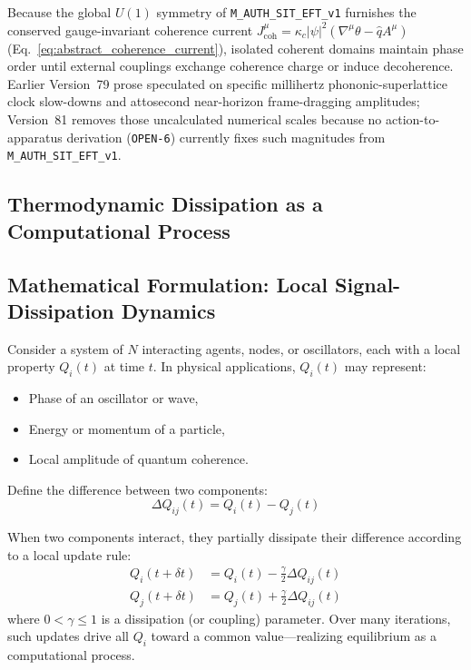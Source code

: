 Because the global $U(1)$ symmetry of \texttt{M\_AUTH\_SIT\_EFT\_v1} furnishes the conserved gauge-invariant coherence current $J^\mu_{\mathrm{coh}} = \kappa_c |\psi|^2 (\nabla^\mu\theta - \hat{q}A^\mu)$ (Eq.~\eqref{eq:abstract_coherence_current}), isolated coherent domains maintain phase order until external couplings exchange coherence charge or induce decoherence. Earlier Version~79 prose speculated on specific millihertz phononic-superlattice clock slow-downs and attosecond near-horizon frame-dragging amplitudes; Version~81 removes those uncalculated numerical scales because no action-to-apparatus derivation (\texttt{OPEN-6}) currently fixes such magnitudes from \texttt{M\_AUTH\_SIT\_EFT\_v1}.

\subsection{Thermodynamic Dissipation as a Computational Process}

\subsection{Mathematical Formulation: Local Signal-Dissipation Dynamics}

Consider a system of $N$ interacting agents, nodes, or oscillators, each with a local property $Q_i(t)$ at time $t$.
In physical applications, $Q_i(t)$ may represent:

\begin{itemize}
    \item Phase of an oscillator or wave,
    \item Energy or momentum of a particle,
    \item Local amplitude of quantum coherence.
\end{itemize}

Define the difference between two components:
\[
\Delta Q_{ij}(t) = Q_i(t) - Q_j(t)
\]

When two components interact, they partially dissipate their difference according to a local update rule:
\begin{align}
Q_i(t+\delta t) &= Q_i(t) - \frac{\gamma}{2} \Delta Q_{ij}(t) \\
Q_j(t+\delta t) &= Q_j(t) + \frac{\gamma}{2} \Delta Q_{ij}(t)
\label{eq:local-update}
\end{align}
where $0 < \gamma \leq 1$ is a dissipation (or coupling) parameter.
Over many iterations, such updates drive all $Q_i$ toward a common value---realizing equilibrium as a computational process.
